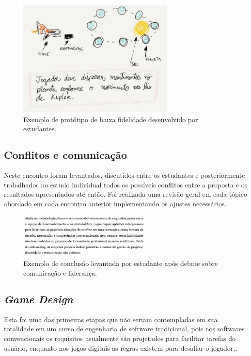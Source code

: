 \documentclass[12pt, onecolumn]{IEEEtran}
\begin{document}
\begin{figure}[H]
    \centering
    \includegraphics[width=0.7\textwidth]{imagens/exemplo-prototipo-baixa.png}
    \caption{Exemplo de protótipo de baixa fidelidade desenvolvido por estudantes.}
    \label{fig:mesh1}
\end{figure}


\subsection{Conflitos e comunicação}

Neste encontro foram levantados, discutidos entre os estudantes e posteriormente trabalhados no estudo individual todos os possíveis conflitos entre a proposta e os resultados apresentados até então. Foi realizada uma revisão geral em cada tópico abordado em cada encontro anterior implementando os ajustes necessários.


\begin{figure}[H]
    \centering
    \includegraphics[width=0.6\textwidth]{imagens/exemplo-comunicao.png}
    \caption{Exemplo de conclusão levantada por estudante após debate sobre comunicação e liderança.}
    \label{fig:mesh1}
\end{figure}

\subsection{\textit{Game Design}}

Esta foi uma das primeiras etapas que não seriam contempladas em sua totalidade em um curso de engenharia de software tradicional, pois nos softwares convencionais os requisitos usualmente são projetados para facilitar tarefas do usuário, enquanto nos jogos digitais as regras existem para desafiar o jogador\cite{b16},\cite{b20}.
\end{document}
